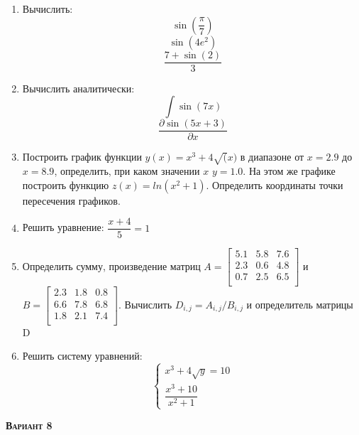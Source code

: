 \begin{enumerate}
\item Вычислить: 
\begin{equation*}\sin \left( \dfrac{\pi}{7} \right)\end{equation*}
\begin{equation*}\sin(4 e^2)                       \end{equation*}
\begin{equation*}\dfrac{7+\sin(2)}{3}              \end{equation*}

\item Вычислить аналитически: 
 \begin{equation*} \int \sin(7x)           \end{equation*}\begin{equation*} {\dfrac{\partial \sin(5 x +3)}{\partial x}} \end{equation*}
\item Построить график функции $y(x)=x^3+4 \sqrt(x)   $ в диапазоне от $x=2.9$ до $x=8.9$, определить, при каком значении $x$ $y=1.0$. На этом же графике построить функцию $z(x)=ln(x^2+1)                 $. Определить координаты точки пересечения графиков. \item Решить уравнение: $\dfrac{x+4}{5}=1     $

\item Определить сумму, произведение матриц $A=\begin{bmatrix}
5.1 &5.8 &7.6 \\
2.3 &0.6 &4.8 \\
0.7 &2.5 &6.5 \\
\end{bmatrix}
$ и $B=\begin{bmatrix}
2.3 &1.8 &0.8 \\
6.6 &7.8 &6.8 \\
1.8 &2.1 &7.4 \\
\end{bmatrix}
$. Вычислить $D_{i,j}=A_{i,j}  /  B_{i,j}$ и определитель матрицы D

\item Решить систему уравнений: \begin{equation*} \begin{cases} x^3+4 \sqrt{y}=10    \\ \dfrac{x^3+10}{x^2+1} \end{cases} \end{equation*} 

\end{enumerate}
\textsc{\textbf{Вариант 8}}

